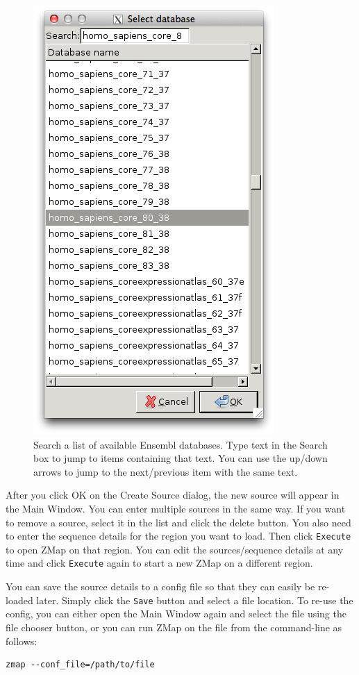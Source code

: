 \documentclass[letterpaper]{article}
\begin{document}
\begin{figure}
\centering
\color[rgb]{0.30980393,0.5058824,0.7411765}
\includegraphics[resolution=150]{images/create_source_ensembl_search_db.png}
\caption{Search a list of available Ensembl databases. Type text in the Search box to jump to items containing that text. You can use the up/down arrows to jump to the next/previous item with the same text.}
\label{img_create_source_ensembl_search_db}
\end{figure}

After you click OK on the Create Source dialog, the new source will appear in the Main Window. You can enter multiple sources in the same way. If you want to remove a source, select it in the list and click the delete button. You also need to enter the sequence details for the region you want to load. Then click \lstinline{Execute} to open ZMap on that region. You can edit the sources/sequence details at any time and click \lstinline{Execute} again to start a new ZMap on a different region.

You can save the source details to a config file so that they can easily be re-loaded later. Simply click the \lstinline{Save} button and select a file location. To re-use the config, you can either open the Main Window again and select the file using the file chooser button, or you can run ZMap on the file from the command-line as follows:
\begin{lstlisting}
zmap --conf_file=/path/to/file
\end{lstlisting}
\end{document}
